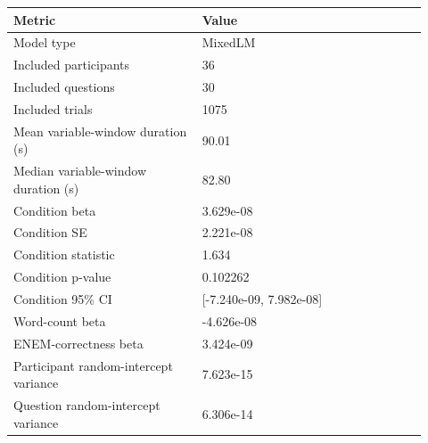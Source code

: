 \begin{tabular}{p{0.42\linewidth}p{0.50\linewidth}}
\toprule
Metric & Value\\
\midrule
Model type & MixedLM\\
Included participants & 36\\
Included questions & 30\\
Included trials & 1075\\
Mean variable-window duration (s) & 90.01\\
Median variable-window duration (s) & 82.80\\
Condition beta & 3.629e-08\\
Condition SE & 2.221e-08\\
Condition statistic & 1.634\\
Condition p-value & 0.102262\\
Condition 95\% CI & [-7.240e-09, 7.982e-08]\\
Word-count beta & -4.626e-08\\
ENEM-correctness beta & 3.424e-09\\
Participant random-intercept variance & 7.623e-15\\
Question random-intercept variance & 6.306e-14\\
\bottomrule
\end{tabular}
